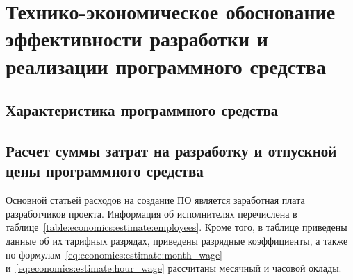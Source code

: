 


\section{Технико-экономическое обоснование эффективности разработки и реализации программного средства}
\label{sec:economics}

\subsection{Характеристика программного средства}
\label{sec:economics:description}



\subsection{Расчет суммы затрат на разработку и отпускной цены программного средства}
\label{sec:economics:estimate}

Основной статьей расходов на создание ПО является заработная плата разработчиков проекта. Информация об исполнителях перечислена в таблице~\ref{table:economics:estimate:employees}. Кроме того, в таблице приведены данные об их тарифных разрядах, приведены разрядные коэффициенты, а также по формулам~\ref{eq:economics:estimate:month_wage} и~\ref{eq:economics:estimate:hour_wage} рассчитаны месячный и часовой оклады.

